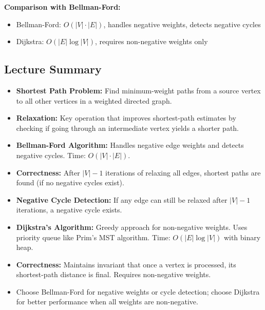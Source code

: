 \textbf{Comparison with Bellman-Ford:}
\begin{itemize}[noitemsep]
  \item Bellman-Ford: $O(|V| \cdot |E|)$, handles negative weights, detects negative cycles
  \item Dijkstra: $O(|E| \log |V|)$, requires non-negative weights only
\end{itemize}

\subsection{Lecture Summary}

\begin{tcolorbox}[colback=lightblue, colframe=keyblue, fonttitle=\bfseries,
                  title={Key Points}]
\begin{itemize}[noitemsep]
  \item \textbf{Shortest Path Problem:} Find minimum-weight paths from a source vertex to all 
        other vertices in a weighted directed graph.
  \item \textbf{Relaxation:} Key operation that improves shortest-path estimates by checking 
        if going through an intermediate vertex yields a shorter path.
  \item \textbf{Bellman-Ford Algorithm:} Handles negative edge weights and detects negative cycles. 
        Time: $O(|V| \cdot |E|)$.
  \item \textbf{Correctness:} After $|V|-1$ iterations of relaxing all edges, shortest paths 
        are found (if no negative cycles exist).
  \item \textbf{Negative Cycle Detection:} If any edge can still be relaxed after $|V|-1$ 
        iterations, a negative cycle exists.
  \item \textbf{Dijkstra's Algorithm:} Greedy approach for non-negative weights. Uses priority 
        queue like Prim's MST algorithm. Time: $O(|E| \log |V|)$ with binary heap.
  \item \textbf{Correctness:} Maintains invariant that once a vertex is processed, its 
        shortest-path distance is final. Requires non-negative weights.
  \item Choose Bellman-Ford for negative weights or cycle detection; choose Dijkstra for 
        better performance when all weights are non-negative.
\end{itemize}
\end{tcolorbox}